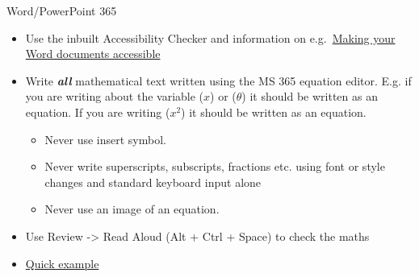 \documentclass[
  ignorenonframetext,
]{beamer}
\providecommand{\tightlist}{%
  \setlength{\itemsep}{0pt}\setlength{\parskip}{0pt}}
\begin{document}
\begin{frame}{Word/PowerPoint 365}
\label{wordpowerpoint-365}
\begin{itemize}
\tightlist
\item
  Use the inbuilt Accessibility Checker and information on
  e.g.~\href{https://support.office.com/en-gb/article/make-your-word-documents-accessible-to-people-with-disabilities-d9bf3683-87ac-47ea-b91a-78dcacb3c66d}{Making
  your Word documents accessible}
\item
  Write \textbf{\emph{all}} mathematical text written using the MS 365
  equation editor. E.g. if you are writing about the variable (\(x\)) or
  (\(\theta\)) it should be written as an equation. If you are writing
  (\(x^2\)) it should be written as an equation.

  \begin{itemize}
  \tightlist
  \item
    Never use insert symbol.
  \item
    Never write superscripts, subscripts, fractions etc. using font or
    style changes and standard keyboard input alone
  \item
    Never use an image of an equation.
  \end{itemize}
\item
  Use Review -\textgreater{} Read Aloud (Alt + Ctrl + Space) to check
  the maths
\item
  \href{./example.docx}{Quick example}
\end{itemize}
\end{frame}
\end{document}

